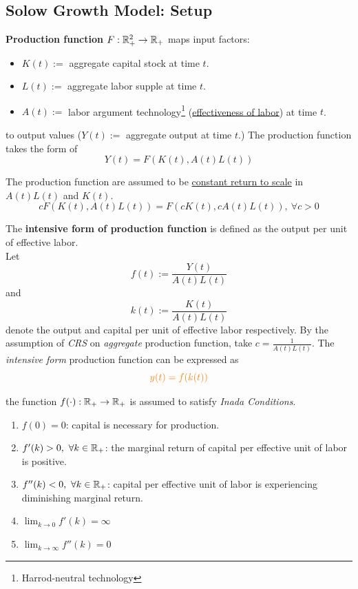 \documentclass[11pt]{article}
\begin{document}
		\subsection{Solow Growth Model: Setup}
			\begin{definition}
				\textbf{Production function} $F: \mathbb{R}^2_{+} \rightarrow \mathbb{R}_+$ maps input factors:
				\begin{itemize}
					\item $K(t) := $ aggregate capital stock at time $t$.
					\item $L(t) := $ aggregate labor supple at time $t$.
					\item $A(t) := $ labor argument technology\footnote{Harrod-neutral technology} (\ul{effectiveness of labor}) at time $t$.
				\end{itemize} 
				to output values ($Y(t) := $ aggregate output at time $t$.) The production function takes the form of
				\[
					Y(t) = F(K(t), A(t)L(t))
				\]
			\end{definition}
			
			\begin{assumption}
				The production function are assumed to be \ul{constant return to scale} in $A(t)L(t)$ and $K(t)$.
				\[
					cF(K(t), A(t)L(t)) = F(cK(t), cA(t)L(t)),\ \forall c > 0
				\]
			\end{assumption}
			
			\begin{definition}
				The \textbf{intensive form of production function} is defined as the output per unit of effective labor. \\
				Let 
				\[
					f(t) := \frac{Y(t)}{A(t)L(t)}
				\] 
				and 
				\[
					k(t) := \frac{K(t)}{A(t)L(t)}
				\] denote the output and capital per unit of effective labor respectively. By the assumption of \emph{CRS} on \emph{aggregate} production function, take $c = \frac{1}{A(t)L(t)}$. The \emph{intensive form} production function can be expressed as
				\begin{equation}
					\textcolor{orange}{
						y(t) = f(k(t))
					}
				\end{equation}
			\end{definition}
			
			\begin{assumption} the function $f(\cdot): \mathbb{R}_+ \rightarrow \mathbb{R}_+$ is assumed to satisfy \emph{Inada Conditions}.
				\begin{enumerate}
					\item $f(0) = 0$: capital is necessary for production.
					\item $f'(k) > 0,\ \forall k \in \mathbb{R}_+$: the marginal return of capital per effective unit of labor is positive.
					\item $f''(k) < 0,\ \forall k \in \mathbb{R}_+$: capital per effective unit of labor is experiencing diminishing marginal return.
					\item $\lim_{k \to 0}f'(k) = \infty$
					\item $\lim_{k \to \infty}f''(k) = 0$
				\end{enumerate}
			\end{assumption}
			
\end{document}
